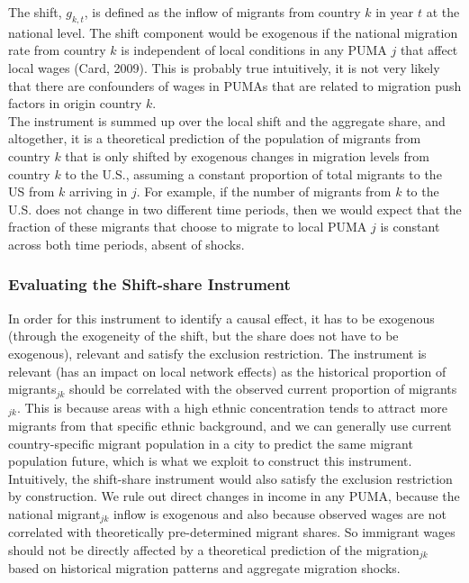 \documentclass[11pt]{article}
\begin{document}
The shift, $g_{k,t}$, is defined as the inflow of migrants from country $k$ in year $t$ at the national level. The shift component would be exogenous if the national migration rate from country $k$ is independent of local conditions in any PUMA $j$ that affect local wages (Card, 2009). This is probably true intuitively, it is not very likely that there are confounders of wages in PUMAs that are related to migration push factors in origin country $k$.  \\

The instrument is summed up over the local shift and the aggregate share, and altogether, it is a theoretical prediction of the population of migrants from country $k$ 
that is only shifted by exogenous changes in migration levels from country $k$ to the U.S., assuming a constant proportion of total migrants to the US from $k$ arriving in $j$.  For example, if the number of migrants from $k$ to the U.S. does not change in two different time periods, then we would expect that the fraction of these migrants that choose to migrate to local PUMA $j$ is constant across both time periods, absent of shocks. 



\subsubsection{Evaluating the Shift-share Instrument}
In order for this instrument to identify a causal effect, it has to be exogenous (through the exogeneity of the shift, but the share does not have to be exogenous), relevant and satisfy the exclusion restriction. The instrument is relevant (has an impact on local network effects) as the historical proportion of migrants$_{jk}$ should be correlated with the observed current proportion of migrants$_{jk}$. This is because areas with a high ethnic concentration tends to attract more migrants from that specific ethnic background, and we can generally use current country-specific migrant population in a city to predict the same migrant population future, which is what we exploit to construct this instrument. \\

Intuitively, the shift-share instrument would also satisfy the exclusion restriction by construction. We rule out direct changes in income in any PUMA, because the national migrant$_{jk}$ inflow is exogenous and also because observed wages are not correlated with theoretically pre-determined migrant shares. So immigrant wages should not be directly affected by a theoretical prediction of the migration$_{jk}$ based on historical migration patterns and aggregate migration shocks.
\end{document}
